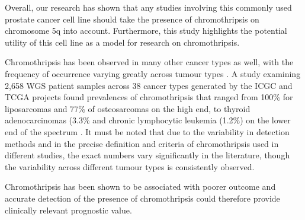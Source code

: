 Overall, our research has shown that any studies involving this commonly used prostate cancer cell line should take the presence of chromothripsis on chromosome 5q into account.
Furthermore, this study highlights the potential utility of this cell line as a model for research on chromothripsis.

Chromothripsis has been observed in many other cancer types as well, with the frequency of occurrence varying greatly across tumour types \cite{cortes2020comprehensive,voronina2020landscape,Koltsova2019,kloosterman2014prevalence}.
A study examining 2,658 WGS patient samples across 38 cancer types generated by the ICGC and TCGA projects found prevalences of chromothripsis that ranged from 100\% for liposarcomas and 77\% of osteosarcomas on the high end, to thyroid adenocarcinomas (3.3\% and chronic lymphocytic leukemia (1.2\%) on the lower end of the spectrum \cite{cortes2020comprehensive}.
It must be noted that due to the variability in detection methods and in the precise definition and criteria of chromothripsis used in different studies, the exact numbers vary significantly in the literature, though the variability across different tumour types is consistently observed.

Chromothripsis has been shown to be associated with poorer outcome \cite{fontana2018chromothripsis,Hirsch2012,magrangeas2011chromothripsis,molenaar} and accurate detection of the presence of chromothripsis could therefore provide clinically relevant prognostic value.




